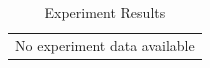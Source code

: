 \begin{table}[h]
\centering
\caption{Experiment Results}
\begin{tabular}{l}
No experiment data available \\
\end{tabular}
\end{table}